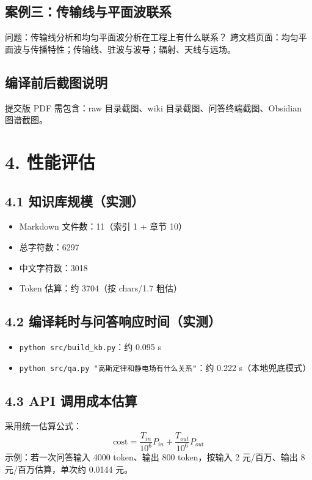 \documentclass[UTF8]{ctexart}
\begin{document}
\subsection{案例三：传输线与平面波联系}
问题：传输线分析和均匀平面波分析在工程上有什么联系？\newline
跨文档页面：均匀平面波与传播特性；传输线、驻波与波导；辐射、天线与远场。

\subsection{编译前后截图说明}
提交版 PDF 需包含：raw 目录截图、wiki 目录截图、问答终端截图、Obsidian 图谱截图。

\section{4. 性能评估}
\subsection{4.1 知识库规模（实测）}
\begin{itemize}[leftmargin=1.5em]
\item Markdown 文件数：11（索引 1 + 章节 10）
\item 总字符数：6297
\item 中文字符数：3018
\item Token 估算：约 3704（按 chars/1.7 粗估）
\end{itemize}

\subsection{4.2 编译耗时与问答响应时间（实测）}
\begin{itemize}[leftmargin=1.5em]
\item \texttt{python src/build\_kb.py}：约 0.095 s
\item \texttt{python src/qa.py "高斯定律和静电场有什么关系"}：约 0.222 s（本地兜底模式）
\end{itemize}

\subsection{4.3 API 调用成本估算}
采用统一估算公式：
\[
\text{cost} = \frac{T_{in}}{10^6} P_{in} + \frac{T_{out}}{10^6} P_{out}
\]
示例：若一次问答输入 4000 token、输出 800 token，按输入 2 元/百万、输出 8 元/百万估算，单次约 0.0144 元。
\end{document}
